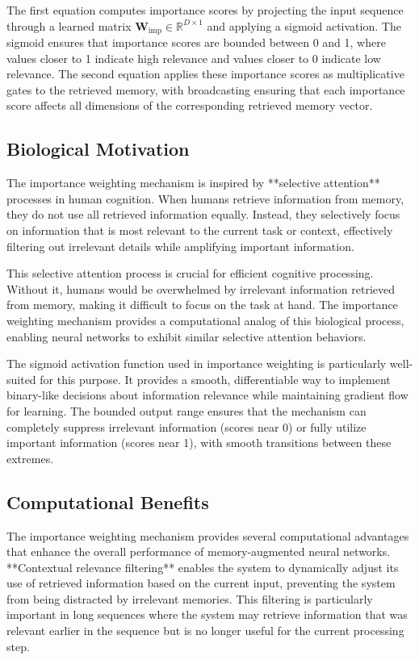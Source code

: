 \documentclass{article}
\begin{document}
The first equation computes importance scores by projecting the input sequence through a learned matrix $\mathbf{W}_{\text{imp}} \in \mathbb{R}^{D \times 1}$ and applying a sigmoid activation. The sigmoid ensures that importance scores are bounded between 0 and 1, where values closer to 1 indicate high relevance and values closer to 0 indicate low relevance. The second equation applies these importance scores as multiplicative gates to the retrieved memory, with broadcasting ensuring that each importance score affects all dimensions of the corresponding retrieved memory vector.

\subsection{Biological Motivation}

The importance weighting mechanism is inspired by **selective attention** processes in human cognition. When humans retrieve information from memory, they do not use all retrieved information equally. Instead, they selectively focus on information that is most relevant to the current task or context, effectively filtering out irrelevant details while amplifying important information.

This selective attention process is crucial for efficient cognitive processing. Without it, humans would be overwhelmed by irrelevant information retrieved from memory, making it difficult to focus on the task at hand. The importance weighting mechanism provides a computational analog of this biological process, enabling neural networks to exhibit similar selective attention behaviors.

The sigmoid activation function used in importance weighting is particularly well-suited for this purpose. It provides a smooth, differentiable way to implement binary-like decisions about information relevance while maintaining gradient flow for learning. The bounded output range ensures that the mechanism can completely suppress irrelevant information (scores near 0) or fully utilize important information (scores near 1), with smooth transitions between these extremes.

\subsection{Computational Benefits}

The importance weighting mechanism provides several computational advantages that enhance the overall performance of memory-augmented neural networks. **Contextual relevance filtering** enables the system to dynamically adjust its use of retrieved information based on the current input, preventing the system from being distracted by irrelevant memories. This filtering is particularly important in long sequences where the system may retrieve information that was relevant earlier in the sequence but is no longer useful for the current processing step.
\end{document}
